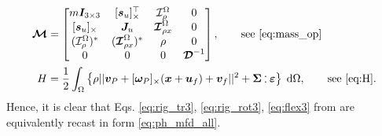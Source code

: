 \documentclass{svjour3}                     %
\newcommand{\crmat}[1]{\ensuremath{[#1]_{\times}}}
\def\onedot{$\mathsurround0pt\ldotp$}
\def\cddot{%
	\mathbin{\vcenter{\baselineskip.67ex
			\hbox{\onedot}\hbox{\onedot}}%
}}
\begin{document}
\begin{align*}
\bm{\mathcal{M}} &= 
\begin{bmatrix}
m \bm{I}_{3\times 3} & \crmat{\bm{s}_u}^\top & \mathcal{I}_\rho^{\Omega} & 0 \\
\crmat{\bm{s}_u} & \bm{J}_u & \bm{\mathcal{I}}_{\rho x}^{\Omega} & 0  \\
(\mathcal{I}_\rho^{\Omega})^* & (\bm{\mathcal{I}}_{\rho x}^{\Omega})^* & \rho & 0  \\
0 & 0 & 0 & \bm{\mathcal{D}}^{-1} \\
\end{bmatrix}, \qquad \text{see \eqref{eq:mass_op}} \\
H &= \frac{1}{2} \int_{\Omega} \left\{\rho ||\bm{v}_P + \crmat{\bm{\omega}_P} (\bm{x}+\bm{u}_f) + {\bm{v}}_f||^2 + \bm\Sigma \cddot \bm\varepsilon \right\}  \d{\Omega}, \qquad \text{see \eqref{eq:H}}.
\end{align*}
Hence, it is clear that Eqs. \eqref{eq:rig_tr3}, \eqref{eq:rig_rot3}, \eqref{eq:flex3} from \cite{simeon2013computational,MB_Daepde} are equivalently recast in form \eqref{eq:ph_mfd_all}.
%
 

\end{document}
